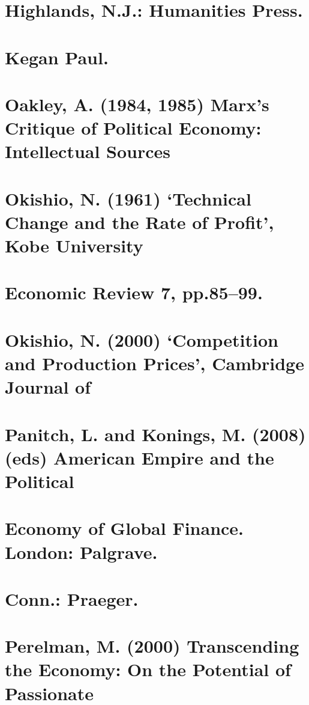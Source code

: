 \section{Highlands, N.J.: Humanities Press.}


\section{Kegan Paul.}


\section{Oakley, A. (1984, 1985) Marx’s Critique of Political Economy: Intellectual Sources}


\section{Okishio, N. (1961) ‘Technical Change and the Rate of Profit’, Kobe University}


\section{Economic Review 7, pp.85–99.}


\section{Okishio, N. (2000) ‘Competition and Production Prices’, Cambridge Journal of}


\section{Panitch, L. and Konings, M. (2008) (eds) American Empire and the Political}


\section{Economy of Global Finance. London: Palgrave.}


\section{Conn.: Praeger.}


\section{Perelman, M. (2000) Transcending the Economy: On the Potential of Passionate}


